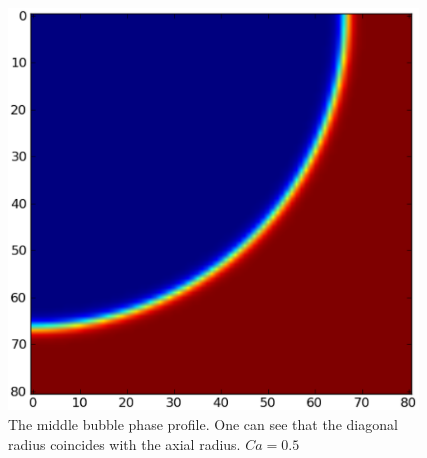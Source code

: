 \documentclass{article}
\begin{document}
\begin{figure}[ht]
\includegraphics[width=0.97\textwidth]{Figures/square.eps}
\caption{The middle bubble phase profile. One can see that the diagonal radius coincides with the
axial radius. {\color{red} $Ca=0.5$} \label{fig:bubble:axisymmetric}}
\end{figure}
\end{document}
